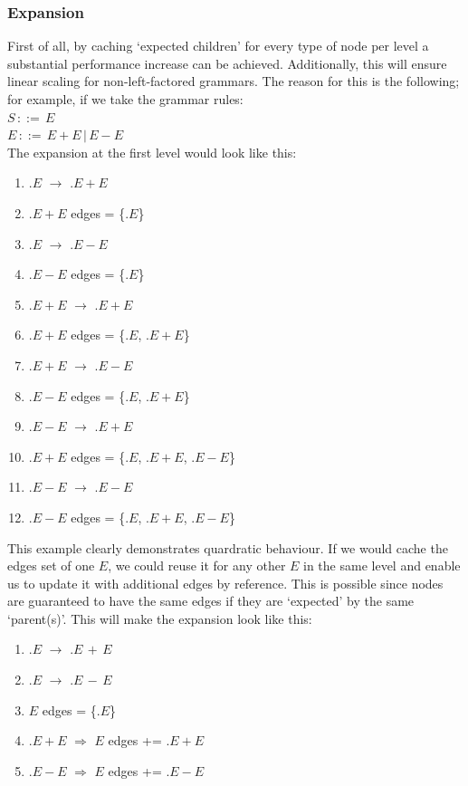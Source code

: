 \documentclass[a4paper,10pt]{article}
\begin{document}
\subsubsection{Expansion}
\label{sec:nodeExpansionOptimization}
First of all, by caching `expected children' for every type of node per level a substantial performance increase can be achieved. Additionally, this will ensure linear scaling for non-left-factored grammars. The reason for this is the following; for example, if we take the grammar rules:\\
$S\,::=\,E$\\
$E\,::=\,E + E\,|\,E - E$\\
The expansion at the first level would look like this:
\begin{enumerate}
 \setlength{\itemsep}{0pt}
 \setlength{\parskip}{0pt}
 \setlength{\parsep}{0pt}
 
 \item $.E$ $\rightarrow$ $.E+E$
 \item $.E+E$ edges = \{$.E$\}
 \item $.E$ $\rightarrow$ $.E-E$
 \item $.E-E$ edges = \{$.E$\}
 \item $.E+E$ $\rightarrow$ $.E+E$
 \item $.E+E$ edges = \{$.E$, $.E+E$\}
 \item $.E+E$ $\rightarrow$ $.E-E$
 \item $.E-E$ edges = \{$.E$, $.E+E$\}
 \item $.E-E$ $\rightarrow$ $.E+E$
 \item $.E+E$ edges = \{$.E$, $.E+E$, $.E-E$\}
 \item $.E-E$ $\rightarrow$ $.E-E$
 \item $.E-E$ edges = \{$.E$, $.E+E$, $.E-E$\}
\end{enumerate}
This example clearly demonstrates quardratic behaviour. If we would cache the edges set of one $E$, we could reuse it for any other $E$ in the same level and enable us to update it with additional edges by reference. This is possible since nodes are guaranteed to have the same edges if they are `expected' by the same `parent(s)'. This will make the expansion look like this:
\begin{enumerate}
 \setlength{\itemsep}{0pt}
 \setlength{\parskip}{0pt}
 \setlength{\parsep}{0pt}
 
 \item $.E$ $\rightarrow$ $.E\,+\,E$
 \item $.E$ $\rightarrow$ $.E\,-\,E$
 \item $E$ edges = \{$.E$\}
 \item $.E+E$ $\Rightarrow$ $E$ edges += $.E+E$
 \item $.E-E$ $\Rightarrow$ $E$ edges += $.E-E$
\end{enumerate}
\end{document}
